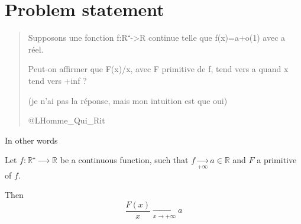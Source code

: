 \documentclass[a4paper, 11pt]{article}
\title{\titlepagetitle}
\author{}
\date{\docdate}
\begin{document}
\maketitle
\thispagestyle{main}

\section{Problem statement}
\blockquote[@LHomme\_Qui\_Rit]{
    Supposons une fonction f:R⁺->R continue telle que f(x)=a+o(1) avec a réel.

    Peut-on affirmer que F(x)/x, avec F primitive de f, tend vers a quand x tend vers +inf ?

    (je n'ai pas la réponse, mais mon intuition est que oui)
}

In other words
\begin{prop}\label{prop|original}
    Let $f:ℝ⁺⟶ℝ$ be a continuous function, such that $f \xrightarrow[+∞]{} a ∈ ℝ$ and $F$ a primitive of $f$.

    Then
    \begin{equation}
        \frac{F(x)}{x} \xrightarrow[x→+∞]{} a
    \end{equation}
\end{prop}
\end{document}
